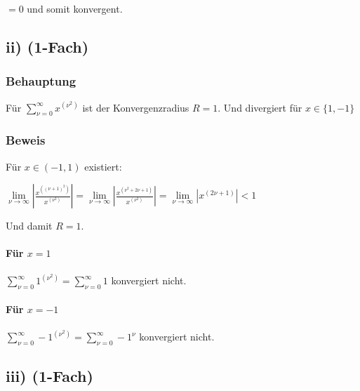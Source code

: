 $ = 0$ und somit konvergent.


\subsection*{ii) (1-Fach)}

\subsubsection*{Behauptung}

Für $\sum\limits^{\infty}_{\nu = 0}x^{(\nu^{2})}$ ist der Konvergenzradius $R = 1$.
Und divergiert für $x \in \{1,-1\}$

\subsubsection*{Beweis}

Für $x \in (-1,1)$ existiert:

$\lim\limits_{\nu \to \infty}|\frac{x^{((\nu+1)^{2})}}{x^{(\nu^{2})}}|
= \lim\limits_{\nu \to \infty}|\frac{x^{(\nu^{2}+2\nu+1)}}{x^{(\nu^{2})}}|
= \lim\limits_{\nu \to \infty}|x^{(2\nu+1)}| < 1$

Und damit $R = 1$.

\paragraph*{Für $x = 1$}

$\sum\limits^{\infty}_{\nu = 0}1^{(\nu^{2})} = \sum\limits^{\infty}_{\nu = 0} 1$ konvergiert nicht.

\paragraph*{Für $x = -1$}

$\sum\limits^{\infty}_{\nu = 0}-1^{(\nu^{2})} = \sum\limits^{\infty}_{\nu = 0} -1^{\nu}$ konvergiert nicht.


\subsection*{iii) (1-Fach)}
